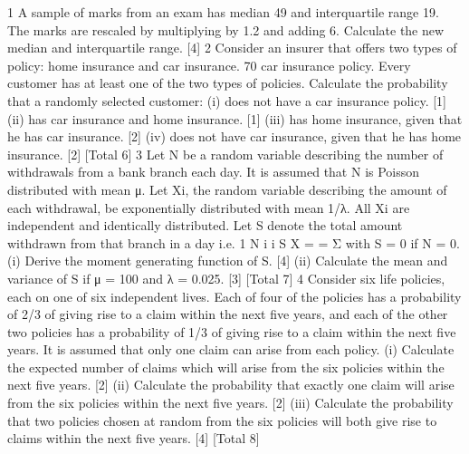 1 A sample of marks from an exam has median 49 and interquartile range 19. The
marks are rescaled by multiplying by 1.2 and adding 6.
Calculate the new median and interquartile range. [4]
2 Consider an insurer that offers two types of policy: home insurance and car insurance.
70%
car insurance policy. Every customer has at least one of the two types of policies.
Calculate the probability that a randomly selected customer:
  (i) does not have a car insurance policy. [1]
(ii) has car insurance and home insurance. [1]
(iii) has home insurance, given that he has car insurance. [2]
(iv) does not have car insurance, given that he has home insurance. [2]
[Total 6]
3 Let N be a random variable describing the number of withdrawals from a bank branch
each day. It is assumed that N is Poisson distributed with mean μ. Let Xi, the random
variable describing the amount of each withdrawal, be exponentially distributed with
mean 1/λ. All Xi are independent and identically distributed. Let S denote the total
amount withdrawn from that branch in a day i.e.
1
N
i
i
S X
=
  = Σ
with S = 0 if N = 0.
(i) Derive the moment generating function of S. [4]
(ii) Calculate the mean and variance of S if μ = 100 and λ = 0.025. [3]
[Total 7]
4 Consider six life policies, each on one of six independent lives. Each of four of the
policies has a probability of 2/3 of giving rise to a claim within the next five years,
and each of the other two policies has a probability of 1/3 of giving rise to a claim
within the next five years. It is assumed that only one claim can arise from each
policy.
(i) Calculate the expected number of claims which will arise from the six policies
within the next five years. [2]
(ii) Calculate the probability that exactly one claim will arise from the six policies
within the next five years. [2]
(iii) Calculate the probability that two policies chosen at random from the six
policies will both give rise to claims within the next five years. [4]
[Total 8]


